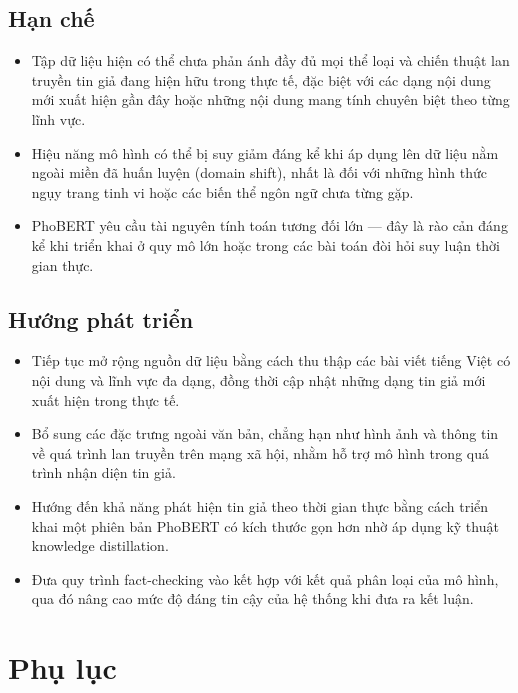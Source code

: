 \section*{Hạn chế}

\begin{itemize}[leftmargin=2em]
  \item Tập dữ liệu hiện có thể chưa phản ánh đầy đủ mọi thể loại và chiến thuật lan truyền tin giả đang hiện hữu trong thực tế, đặc biệt với các dạng nội dung mới xuất hiện gần đây hoặc những nội dung mang tính chuyên biệt theo từng lĩnh vực.

  \item Hiệu năng mô hình có thể bị suy giảm đáng kể khi áp dụng lên dữ liệu nằm ngoài miền đã huấn luyện (domain shift), nhất là đối với những hình thức ngụy trang tinh vi hoặc các biến thể ngôn ngữ chưa từng gặp.

  \item PhoBERT yêu cầu tài nguyên tính toán tương đối lớn --- đây là rào cản đáng kể khi triển khai ở quy mô lớn hoặc trong các bài toán đòi hỏi suy luận thời gian thực.
\end{itemize}

\section*{Hướng phát triển}

\begin{itemize}[leftmargin=2em]

  \item Tiếp tục mở rộng nguồn dữ liệu bằng cách thu thập các bài viết tiếng Việt có nội dung và lĩnh vực đa dạng, đồng thời cập nhật những dạng tin giả mới xuất hiện trong thực tế.

  \item Bổ sung các đặc trưng ngoài văn bản, chẳng hạn như hình ảnh và thông tin về quá trình lan truyền trên mạng xã hội, nhằm hỗ trợ mô hình trong quá trình nhận diện tin giả.

  \item Hướng đến khả năng phát hiện tin giả theo thời gian thực bằng cách triển khai một phiên bản PhoBERT có kích thước gọn hơn nhờ áp dụng kỹ thuật knowledge distillation.

  \item Đưa quy trình fact-checking vào kết hợp với kết quả phân loại của mô hình, qua đó nâng cao mức độ đáng tin cậy của hệ thống khi đưa ra kết luận.

\end{itemize}



\cleardoublepage
\chapter*{Phụ lục}


